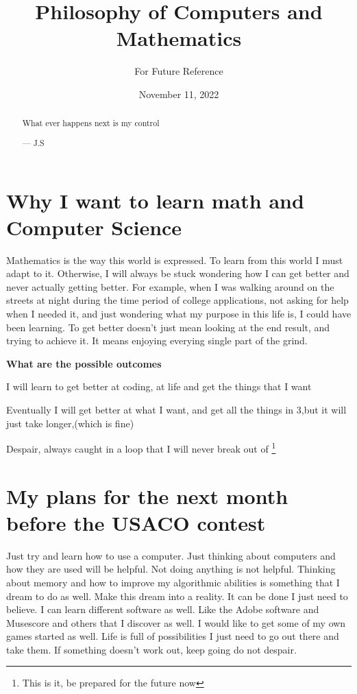 \documentclass[11pt]{scrartcl}
\begin{document}
\title{Philosophy of Computers and Mathematics}
\subtitle{For Future Reference}
\date{November 11, 2022}
\maketitle

\begin{abstract}
  \sffamily\small
  What ever happens next is my control

  \medskip

  --- J.S
\end{abstract}

\section{Why I want to learn math and Computer Science}
Mathematics is the way this world is expressed. To learn from this world I must adapt to it. Otherwise, I will always be stuck wondering how I can get better and never actually getting better. For example, when I was walking around on the streets at night during the time period of college applications, not asking for help when I needed it, and just wondering what my purpose in this life is, I could have been learning. To get better doesn't just mean looking at the end result, and trying to achieve it. It means enjoying everying single part of the grind.

   \textbf{What are the possible outcomes}
   
    I will learn to get better at coding, at life and get the things that I want 
  
   Eventually I will get better at what I want, and get all the things in 3,but it will just take longer,(which is fine) 
  
    Despair, always caught in a loop that I will never break out of
\footnote{This is it, be prepared for the future now}

\section{My plans for the next month before the USACO contest}
Just try and learn how to use a computer. Just thinking about computers and how they are used will be helpful. Not doing anything is not helpful. Thinking about memory and how to improve my algorithmic abilities is something that I dream to do as well. Make this dream into a reality. It can be done I just need to believe. I can learn different software as well. Like the Adobe software and Musescore and others that I discover as well. I would like to get some of my own games started as well. Life is full of possibilities I just need to go out there and take them. If something doesn't work out, keep going do not despair. 
\end{document}
